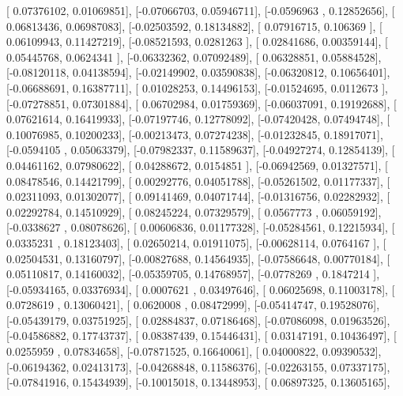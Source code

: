 \documentclass{article}
\begin{document}
       [ 0.07376102,  0.01069851],
       [-0.07066703,  0.05946711],
       [-0.0596963 ,  0.12852656],
       [ 0.06813436,  0.06987083],
       [-0.02503592,  0.18134882],
       [ 0.07916715,  0.106369  ],
       [ 0.06109943,  0.11427219],
       [-0.08521593,  0.0281263 ],
       [ 0.02841686,  0.00359144],
       [ 0.05445768,  0.0624341 ],
       [-0.06332362,  0.07092489],
       [ 0.06328851,  0.05884528],
       [-0.08120118,  0.04138594],
       [-0.02149902,  0.03590838],
       [-0.06320812,  0.10656401],
       [-0.06688691,  0.16387711],
       [ 0.01028253,  0.14496153],
       [-0.01524695,  0.0112673 ],
       [-0.07278851,  0.07301884],
       [ 0.06702984,  0.01759369],
       [-0.06037091,  0.19192688],
       [ 0.07621614,  0.16419933],
       [-0.07197746,  0.12778092],
       [-0.07420428,  0.07494748],
       [ 0.10076985,  0.10200233],
       [-0.00213473,  0.07274238],
       [-0.01232845,  0.18917071],
       [-0.0594105 ,  0.05063379],
       [-0.07982337,  0.11589637],
       [-0.04927274,  0.12854139],
       [ 0.04461162,  0.07980622],
       [ 0.04288672,  0.0154851 ],
       [-0.06942569,  0.01327571],
       [ 0.08478546,  0.14421799],
       [ 0.00292776,  0.04051788],
       [-0.05261502,  0.01177337],
       [ 0.02311093,  0.01302077],
       [ 0.09141469,  0.04071744],
       [-0.01316756,  0.02282932],
       [ 0.02292784,  0.14510929],
       [ 0.08245224,  0.07329579],
       [ 0.0567773 ,  0.06059192],
       [-0.0338627 ,  0.08078626],
       [ 0.00606836,  0.01177328],
       [-0.05284561,  0.12215934],
       [ 0.0335231 ,  0.18123403],
       [ 0.02650214,  0.01911075],
       [-0.00628114,  0.0764167 ],
       [ 0.02504531,  0.13160797],
       [-0.00827688,  0.14564935],
       [-0.07586648,  0.00770184],
       [ 0.05110817,  0.14160032],
       [-0.05359705,  0.14768957],
       [-0.0778269 ,  0.1847214 ],
       [-0.05934165,  0.03376934],
       [ 0.0007621 ,  0.03497646],
       [ 0.06025698,  0.11003178],
       [ 0.0728619 ,  0.13060421],
       [ 0.0620008 ,  0.08472999],
       [-0.05414747,  0.19528076],
       [-0.05439179,  0.03751925],
       [ 0.02884837,  0.07186468],
       [-0.07086098,  0.01963526],
       [-0.04586882,  0.17743737],
       [ 0.08387439,  0.15446431],
       [ 0.03147191,  0.10436497],
       [ 0.0255959 ,  0.07834658],
       [-0.07871525,  0.16640061],
       [ 0.04000822,  0.09390532],
       [-0.06194362,  0.02413173],
       [-0.04268848,  0.11586376],
       [-0.02263155,  0.07337175],
       [-0.07841916,  0.15434939],
       [-0.10015018,  0.13448953],
       [ 0.06897325,  0.13605165],
\end{document}

